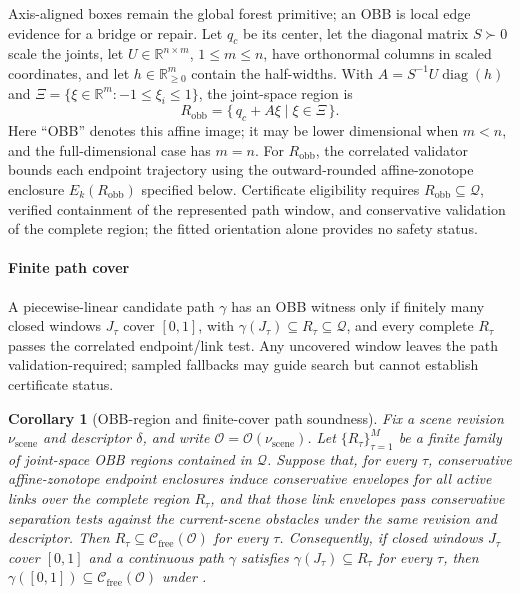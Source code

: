 \documentclass[journal]{IEEEtran}
\newtheorem{corollary}{Corollary}
\newcommand{\Real}{\ensuremath{\mathbb{R}}}
\newcommand{\Cfree}{\ensuremath{\mathcal{C}_{\mathrm{free}}}}
\newcommand{\calO}{\ensuremath{\mathcal{O}}}
\newcommand{\Q}{\ensuremath{\mathcal{Q}}}
\begin{document}
Axis-aligned boxes remain the global forest primitive; an OBB is local edge
evidence for a bridge or repair. Let \(q_c\) be its center, let the diagonal
matrix \(S\succ0\) scale the joints, let \(U\in\Real^{n\times m}\), $1\le m\le n$,
have orthonormal columns in scaled coordinates, and let
\(h\in\Real_{\ge0}^{m}\) contain the
half-widths. With \(A=S^{-1}U\operatorname{diag}(h)\) and
\(\Xi=\{\xi\in\Real^m:-1\le\xi_i\le1\}\), the joint-space region is
\[
R_{\mathrm{obb}}
=
\{\,q_c + A\xi \mid \xi\in\Xi\,\}.
\]
Here ``OBB'' denotes this affine image; it may be lower dimensional when
$m<n$, and the full-dimensional case has $m=n$.
For $R_{\mathrm{obb}}$, the correlated validator bounds each endpoint
trajectory using the outward-rounded affine-zonotope enclosure
$E_k(R_{\mathrm{obb}})$ specified below.
Certificate eligibility requires \(R_{\mathrm{obb}}\subseteq\Q\), verified
containment of the represented path window, and conservative validation of the
complete region; the fitted orientation alone provides no safety status.

\paragraph{Finite path cover}
A piecewise-linear candidate path $\gamma$ has an OBB witness only if finitely
many closed windows $J_\tau$ cover $[0,1]$, with
$\gamma(J_\tau)\subseteq R_\tau\subseteq\Q$, and every complete $R_\tau$ passes
the correlated endpoint/link test. Any uncovered window leaves the path
validation-required; sampled fallbacks may guide search but cannot establish
certificate status.

\begin{corollary}[OBB-region and finite-cover path soundness]
\label{cor:obb_corridor}
Fix a scene revision $\nu_{\mathrm{scene}}$ and descriptor $\delta$, and write
$\calO=\calO(\nu_{\mathrm{scene}})$. Let $\{R_\tau\}_{\tau=1}^{M}$ be a finite
family of joint-space OBB regions contained in $\Q$. Suppose that, for every
$\tau$, conservative affine-zonotope endpoint enclosures induce
conservative envelopes for all active links over the complete region $R_\tau$,
and that those link envelopes pass conservative separation tests against the
current-scene obstacles under the same revision and descriptor. Then
$R_\tau\subseteq\Cfree(\calO)$ for every $\tau$. Consequently, if closed
windows $J_\tau$ cover $[0,1]$ and a continuous path $\gamma$ satisfies
$\gamma(J_\tau)\subseteq R_\tau$ for every $\tau$, then
$\gamma([0,1])\subseteq\Cfree(\calO)$ under .
\end{corollary}
\end{document}
